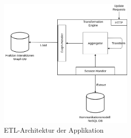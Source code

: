 \begin{figure}[H]
    \centering
    \includegraphics[width=0.60\textwidth]{images/ETL_Factions_Detail.png}
    \caption{ETL-Architektur der Applikation}
    \label{fig:faction-etl-app}
\end{figure}  
